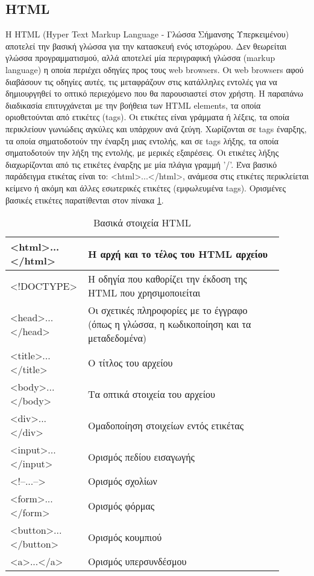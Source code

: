 \subsection{HTML}
Η HTML (Hyper Text Markup Language - Γλώσσα Σήμανσης Υπερκειμένου) αποτελεί την βασική γλώσσα για την κατασκευή ενός ιστοχώρου. Δεν θεωρείται γλώσσα προγραμματισμού, αλλά αποτελεί μία περιγραφική γλώσσα (markup language) η οποία περιέχει οδηγίες προς τους web browsers. Οι web browsers αφού διαβάσουν τις οδηγίες αυτές, τις μεταφράζουν στις κατάλληλες εντολές για να δημιουργηθεί το οπτικό περιεχόμενο που θα παρουσιαστεί στον χρήστη. Η παραπάνω διαδικασία επιτυγχάνεται με την βοήθεια των HTML elements, τα οποία οριοθετούνται από ετικέτες (tags). Οι ετικέτες είναι γράμματα ή λέξεις, τα οποία περικλείουν γωνιώδεις αγκύλες και υπάρχουν ανά ζεύγη. Χωρίζονται σε tags έναρξης, τα οποία σηματοδοτούν την έναρξη μιας εντολής, και σε tags λήξης, τα οποία σηματοδοτούν την λήξη της εντολής, με μερικές εξαιρέσεις. Οι ετικέτες λήξης διαχωρίζονται από τις ετικέτες έναρξης με μία πλάγια γραμμή '/'. Ένα βασικό παράδειγμα ετικέτας είναι το: <html>...</html>, ανάμεσα στις ετικέτες περικλείεται κείμενο ή ακόμη και άλλες εσωτερικές ετικέτες (εμφωλευμένα tags). Ορισμένες βασικές ετικέτες παρατίθενται στον πίνακα \ref{tbl:html_basic_elements}.

\begin{table}[h]
	\caption{Βασικά στοιχεία HTML}
	\label{tbl:html_basic_elements}
	\begin{tabular}{|p{0.2\linewidth}|p{0.7\linewidth}|}
		\hline
		\textless{}html\textgreater{}...\textless{}/html\textgreater{} & Η αρχή και το τέλος του HTML αρχείου \\ \hline
		\textless{}!DOCTYPE\textgreater{} & Η οδηγία που καθορίζει την έκδοση της HTML που χρησιμοποιείται \\ \hline
		\textless{}head\textgreater{}...\textless{}/head\textgreater{} & Οι σχετικές πληροφορίες με το έγγραφο (όπως η γλώσσα, η κωδικοποίηση και τα μεταδεδομένα) \\ \hline
		\textless{}title\textgreater{}...\textless{}/title\textgreater{} & Ο τίτλος του αρχείου \\ \hline
		\textless{}body\textgreater{}...\textless{}/body\textgreater{} & Τα οπτικά στοιχεία του αρχείου \\ \hline
		\textless{}div\textgreater{}...\textless{}/div\textgreater{} & Ομαδοποίηση στοιχείων εντός ετικέτας \\ \hline
		\textless{}input\textgreater{}...\textless{}/input\textgreater{} & Ορισμός πεδίου εισαγωγής \\ \hline
		\textless{}!--...--\textgreater{} & Ορισμός σχολίων \\ \hline
		\textless{}form\textgreater{}...\textless{}/form\textgreater{} & Ορισμός φόρμας \\ \hline
		\textless{}button\textgreater{}...\textless{}/button\textgreater{} & Ορισμός κουμπιού \\ \hline
		\textless{}a\textgreater{}...\textless{}/a\textgreater{} & Ορισμός υπερσυνδέσμου \\ \hline
	\end{tabular}
\end{table}

